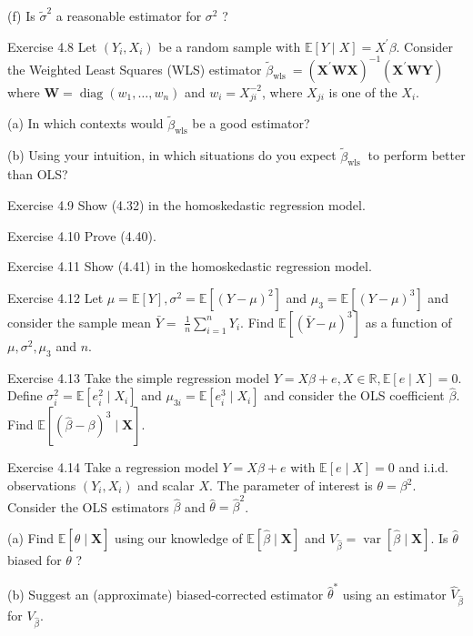 \documentclass[10pt]{article}
\begin{document}
(f) Is $\widetilde{\sigma}^{2}$ a reasonable estimator for $\sigma^{2}$ ?

Exercise 4.8 Let $\left(Y_{i}, X_{i}\right)$ be a random sample with $\mathbb{E}[Y \mid X]=X^{\prime} \beta$. Consider the Weighted Least Squares (WLS) estimator $\widetilde{\beta}_{\text {wls }}=\left(\boldsymbol{X}^{\prime} \boldsymbol{W} \boldsymbol{X}\right)^{-1}\left(\boldsymbol{X}^{\prime} \boldsymbol{W} \boldsymbol{Y}\right)$ where $\boldsymbol{W}=\operatorname{diag}\left(w_{1}, \ldots, w_{n}\right)$ and $w_{i}=X_{j i}^{-2}$, where $X_{j i}$ is one of the $X_{i}$.

(a) In which contexts would $\widetilde{\beta}_{\mathrm{wls}}$ be a good estimator?

(b) Using your intuition, in which situations do you expect $\widetilde{\beta}_{\text {wls }}$ to perform better than OLS?

Exercise 4.9 Show (4.32) in the homoskedastic regression model.

Exercise 4.10 Prove (4.40).

Exercise 4.11 Show (4.41) in the homoskedastic regression model.

Exercise 4.12 Let $\mu=\mathbb{E}[Y], \sigma^{2}=\mathbb{E}\left[(Y-\mu)^{2}\right]$ and $\mu_{3}=\mathbb{E}\left[(Y-\mu)^{3}\right]$ and consider the sample mean $\bar{Y}=$ $\frac{1}{n} \sum_{i=1}^{n} Y_{i}$. Find $\mathbb{E}\left[(\bar{Y}-\mu)^{3}\right]$ as a function of $\mu, \sigma^{2}, \mu_{3}$ and $n$.

Exercise 4.13 Take the simple regression model $Y=X \beta+e, X \in \mathbb{R}, \mathbb{E}[e \mid X]=0$. Define $\sigma_{i}^{2}=\mathbb{E}\left[e_{i}^{2} \mid X_{i}\right]$ and $\mu_{3 i}=\mathbb{E}\left[e_{i}^{3} \mid X_{i}\right]$ and consider the OLS coefficient $\widehat{\beta}$. Find $\mathbb{E}\left[(\widehat{\beta}-\beta)^{3} \mid \boldsymbol{X}\right]$.

Exercise 4.14 Take a regression model $Y=X \beta+e$ with $\mathbb{E}[e \mid X]=0$ and i.i.d. observations $\left(Y_{i}, X_{i}\right)$ and scalar $X$. The parameter of interest is $\theta=\beta^{2}$. Consider the OLS estimators $\widehat{\beta}$ and $\widehat{\theta}=\widehat{\beta}^{2}$.

(a) Find $\mathbb{E}[\widehat{\theta} \mid \boldsymbol{X}]$ using our knowledge of $\mathbb{E}[\widehat{\beta} \mid \boldsymbol{X}]$ and $V_{\widehat{\beta}}=\operatorname{var}[\widehat{\beta} \mid \boldsymbol{X}]$. Is $\widehat{\theta}$ biased for $\theta$ ?

(b) Suggest an (approximate) biased-corrected estimator $\widehat{\theta}^{*}$ using an estimator $\widehat{V}_{\widehat{\beta}}$ for $V_{\widehat{\beta}}$.
\end{document}
